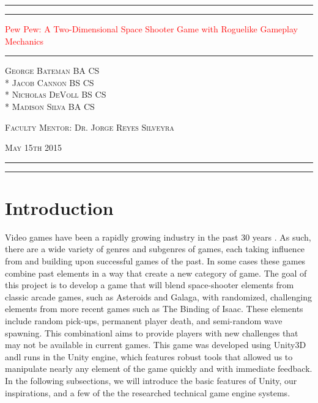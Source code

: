 \documentclass[12pt]{article}       %
\def\hs{\hspace{15pt}}
\newcommand*{\titleAT}{\begingroup %
\newlength{\drop} %
\drop=0.1\textheight %

\rule{\textwidth}{1pt}\par %
\vspace{2pt}\vspace{-\baselineskip} %
\rule{\textwidth}{0.4pt}\par %

\vspace{\drop} %
\centering %
\textcolor{Red}{ %
{\Huge Pew Pew: A Two-Dimensional Space Shooter Game with Roguelike Gameplay Mechanics}\\[0.5\baselineskip] %
{\Huge }} %

\vspace{0.25\drop} %
\rule{0.3\textwidth}{0.4pt}\par %
\vspace{\drop} %

{\Large \textsc{George Bateman BA CS \\* Jacob Cannon BS CS \\* Nicholas DeVoll BS CS \\* \vspace{3pt} Madison Silva BA CS}}\par %

\vfill %

{\large \textsc{Faculty Mentor: Dr. Jorge Reyes Silveyra}}\par 

{\large \textsc{May 15th 2015}}\par

\vspace*{\drop} %

\rule{\textwidth}{0.4pt}\par %
\vspace{2pt}\vspace{-\baselineskip} %
\rule{\textwidth}{1pt}\par %

\endgroup}
\begin{document}
\begin{titlepage}
\thispagestyle{empty}
\titleAT
\end{titlepage}

\newpage
\begin{titlepage}
\thispagestyle{empty}
\tableofcontents
\end{titlepage}

\begin{titlepage}
\thispagestyle{empty}
\listoffigures
\end{titlepage}


\newpage


\section{Introduction} %
\label{sec:intro}

\hs Video games have been a rapidly growing industry in the past 30 years \cite{History}. As such, there are a wide variety of genres and subgenres of games, each taking influence from and building upon successful games of the past. In some cases these games combine past elements in a way that create a new category of game. The goal of this project is to develop a game that will blend space-shooter elements from classic arcade games, such as Asteroids and Galaga, with randomized, challenging elements from more recent games such as The Binding of Isaac. These elements include random pick-ups, permanent player death, and semi-random wave spawning. This combinationl aims to provide players with new challenges that may not be available in current games. This game was developed using Unity3D andl runs in the Unity engine, which features robust tools that allowed us to manipulate nearly any element of the game quickly and with immediate feedback. In the following subsections, we will introduce the basic features of Unity, our inspirations, and a few of the the researched technical game engine systems. 
\end{document}
